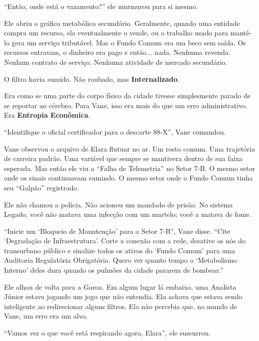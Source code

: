 ``Então, onde está o vazamento?'' ele murmurou para si mesmo.

Ele abriu o gráfico metabólico secundário. Geralmente, quando uma entidade compra um recurso, ela eventualmente o vende, ou o trabalho usado para mantê-lo gera um serviço tributável. Mas o Fundo Comum era um beco sem saída. Os recursos entravam, o dinheiro era pago e então... nada. Nenhuma revenda. Nenhum contrato de serviço. Nenhuma atividade de mercado secundário.

O filtro havia sumido. Não roubado, mas \textbf{Internalizado}.

Era como se uma parte do corpo físico da cidade tivesse simplesmente parado de se reportar ao cérebro. Para Vane, isso era mais do que um erro administrativo. Era \textbf{Entropia Econômica}.

``Identifique o oficial certificador para o descarte 88-X'', Vane comandou.


Vane observou o arquivo de Elara flutuar no ar. Um rosto comum. Uma trajetória de carreira padrão. Uma variável que sempre se mantivera dentro de sua faixa esperada. Mas então ele viu a ``Falha de Telemetria'' no Setor 7-B. O mesmo setor onde os sinais continuavam sumindo. O mesmo setor onde o Fundo Comum tinha seu ``Galpão'' registrado.

Ele não chamou a polícia. Não acionou um mandado de prisão. No sistema Legado, você não matava uma infecção com um martelo; você a matava de fome.

``Inicie um `Bloqueio de Manutenção' para o Setor 7-B'', Vane disse. ``Cite `Degradação de Infraestrutura'. Corte a conexão com a rede, desative os nós do transurbano público e sinalize todos os ativos do `Fundo Comum' para uma Auditoria Regulatória Obrigatória. Quero ver quanto tempo o `Metabolismo Interno' deles dura quando os pulmões da cidade pararem de bombear.''

Ele olhou de volta para a Garoa. Em algum lugar lá embaixo, uma Analista Júnior estava jogando um jogo que não entendia. Ela achava que estava sendo inteligente ao redirecionar alguns filtros. Ela não percebia que, no mundo de Vane, um erro era um alvo.

``Vamos ver o que você está respirando agora, Elara'', ele sussurrou.
